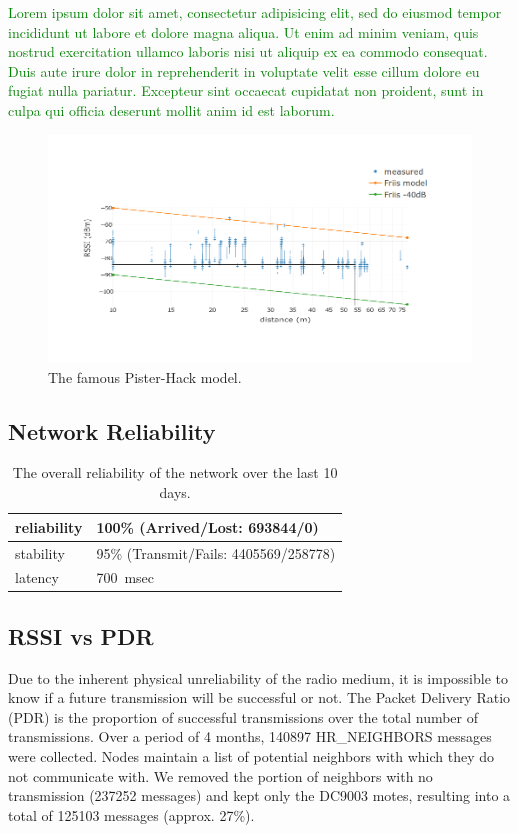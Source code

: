 \documentclass{sig-alternate}
\newcommand{\lorem}               {\textcolor{green}{Lorem ipsum dolor sit amet, consectetur adipisicing elit, sed do eiusmod tempor incididunt ut labore et dolore magna aliqua. Ut enim ad minim veniam, quis nostrud exercitation ullamco laboris nisi ut aliquip ex ea commodo consequat. Duis aute irure dolor in reprehenderit in voluptate velit esse cillum dolore eu fugiat nulla pariatur. Excepteur sint occaecat cupidatat non proident, sunt in culpa qui officia deserunt mollit anim id est laborum.}}
\begin{document}
\lorem

\begin{figure}
    \centering
    \includegraphics[width=\columnwidth]{pister_hack}
    \caption{The famous Pister-Hack model.}
    \label{fig:pister_hack}
\end{figure}

\subsection{Network Reliability}
\label{sec:net_reliability}

\begin{table}
    \begin{tabular}{|l|l|}
        \hline
        reliability & 100\% (Arrived/Lost:   693844/0)\\ \hline
        stability   & 95\% (Transmit/Fails: 4405569/258778)\\ \hline
        latency     & 700~msec\\
        \hline
    \end{tabular}
    \caption{The overall reliability of the network over the last 10 days.}
\end{table}

\subsection{RSSI vs PDR}


Due to the inherent physical unreliability of the radio medium, it is impossible to know if a future transmission will be successful or not.
The Packet Delivery Ratio (PDR) is the proportion of successful transmissions over the total number of transmissions.
Over a period of 4 months, 140897 HR\_NEIGHBORS messages were collected.
Nodes maintain a list of potential neighbors with which they do not communicate with.
We removed the portion of neighbors with no transmission (237252 messages) and kept only the DC9003 motes, resulting into a total of 125103 messages (approx. 27\%).
\end{document}
